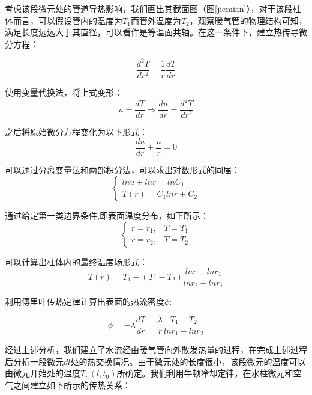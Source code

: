 \documentclass{my_paper}
\begin{document}
考虑该段微元处的管道导热影响，我们画出其截面图（图\ref{jiemian}），对于该段柱体而言，可以假设管内的温度为$T_1$而管外温度为$T_2$，观察暖气管的物理结构可知，满足长度远远大于其直径，可以看作是等温面共轴。在这一条件下，建立热传导微分方程：

\begin{equation}
\frac{d^{2}T}{dr^{2}} + \frac{1}{r}\frac{dT}{dr}
\end{equation}

使用变量代换法，将上式变形：
\begin{equation}
u = \frac{dT}{dr} \Rightarrow  \frac{du}{dr}=\frac{d^2T}{dr^2}
\label{}
\end{equation}

之后将原始微分方程变化为以下形式：
\begin{equation}
\frac{du}{dr}+\frac{u}{r} = 0
\label{}
\end{equation}

可以通过分离变量法和两部积分法，可以求出对数形式的同届：
\begin{equation}
    \begin{cases}
        ln u +lnr = lnC_1\\
        T(r) = C_1 lnr + C_2
    \end{cases}
\label{}
\end{equation}

通过给定第一类边界条件\cite{1},即表面温度分布，如下所示：
\begin{equation}
    \begin{cases}
        r = r_1 , & T = T_1\\
        r = r_2 , & T = T_2
    \end{cases}
\end{equation}

可以计算出柱体内的最终温度场形式：
\begin{equation}
    T(r) = T_1 - (T_1-T_2)\frac{lnr - lnr_1}{lnr_2 - lnr_1}
\end{equation}

利用傅里叶传热定律计算出表面的热流密度$\phi$:

\begin{equation}
    \phi = -\lambda \frac{dT}{dr} = \frac{\lambda}{r}\frac{T_1-T_2}{lnr_1-lnr_2}
\end{equation}

经过上述分析，我们建立了水流经由暖气管向外散发热量的过程，在完成上述过程后分析一段微元$dl$处的热交换情况。由于微元处的长度很小，该段微元的温度可以由微元开始处的温度$T_n(l,t_0)$所确定。我们利用牛顿冷却定律\cite{1}，在水柱微元和空气之间建立如下所示的传热关系：
\end{document}
